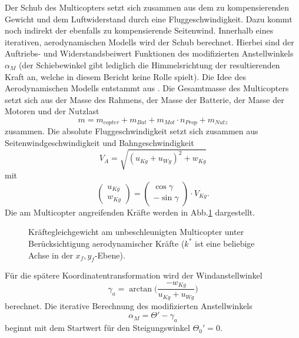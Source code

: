 Der Schub des Multicopters setzt sich zusammen aus dem zu kompensierenden Gewicht und dem Luftwiderstand durch eine Fluggeschwindigkeit. Dazu kommt noch indirekt der ebenfalls zu kompensierende Seitenwind. Innerhalb eines iterativen, aerodynamischen Modells wird der Schub berechnet. Hierbei sind der Auftriebs- und Widerstandsbeiwert Funktionen des modifizierten Anstellwinkels \ensuremath{\alpha_M} (der Schiebewinkel gibt lediglich die Himmelsrichtung der resultierenden Kraft an, welche in diesem Bericht keine Rolle spielt). Die Idee des Aerodynamischen Modells entstammt aus \cite{Beyer.2016}. 
Die Gesamtmasse des Multicopters setzt sich aus der Masse des Rahmens, der Masse der Batterie, der Masse der Motoren und der Nutzlast
\begin{equation}
	m = m_{copter}+m_{Bat}+m_{Mot}\cdot n_{Prop}+m_{Nutz}
	\label{eq:masse_multicopter}
\end{equation}
zusammen.
Die absolute Fluggeschwindigkeit setzt sich zusammen aus Seitenwindgeschwindigkeit und Bahngeschwindigkeit
\begin{equation}
	V_A = \sqrt{(u_{Kg} + u_{Wg})^2+w_{Kg}}
\end{equation}
mit
\begin{equation}
	\begin{pmatrix} u_{Kg} \\ w_{Kg} \end{pmatrix} = \begin{pmatrix}
	\cos\gamma \\ -\sin\gamma	\end{pmatrix} \cdot V_{Kg}.
\end{equation}
Die am Multicopter angreifenden Kräfte werden in Abb.\ref{abb:kraefteggw} dargestellt. 

\begin{figure}[H]
\centering
\begin{small}
	
	\end{small}
	\caption{Kräftegleichgewicht am unbeschleunigten Multicopter unter Berücksichtigung aerodynamischer Kräfte ($k^*$ ist eine beliebige Achse in der $x_f,y_f$-Ebene).}
	\label{abb:kraefteggw}
\end{figure}

Für die spätere Koordinatentransformation wird der Windanstellwinkel
\begin{equation}
	\gamma_a = \arctan \Big(\frac{-w_{Kg}}{u_{Kg}+u_{Wg}}\Big)
\end{equation}
berechnet.
Die iterative Berechnung des modifizierten Anstellwinkels 
\begin{equation}
	\alpha_M = \Theta '-\gamma_a
\end{equation} 
beginnt mit dem Startwert für den Steigungswinkel \ensuremath{\Theta_0'=0}.

